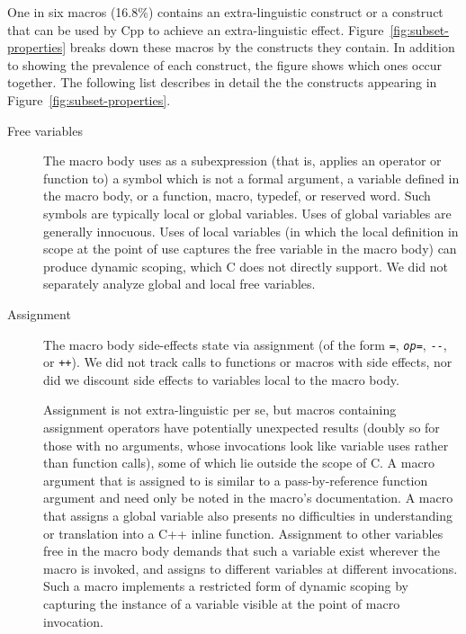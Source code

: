 \documentclass[10pt]{article}
\begin{document}
One in six macros (16.8\%) contains an extra-linguistic construct or a
construct that can be used by Cpp to achieve an extra-linguistic effect.
Figure~\ref{fig:subset-properties} breaks down these macros by the
constructs they contain.  In addition to showing the prevalence of each
construct, the figure shows which ones occur together.  The following list
describes in detail the the constructs appearing in
Figure~\ref{fig:subset-properties}.


\label{desc:properties}

\begin{description}
\item[Free variables]\label{page:freevar}
  The macro body uses as a subexpression (that is, applies an operator or
  function to) a symbol which is not a formal argument, a variable defined
  in the macro body, or a function, macro, typedef, or reserved word.  Such
  symbols are typically local or global variables.  Uses of global
  variables are generally innocuous.  Uses of local variables (in which the
  local definition in scope at the point of use captures the free variable
  in the macro body) can produce dynamic scoping, which C does
  not directly support.  We did not separately analyze global and local
  free variables.

\item[Assignment]
  The macro body side-effects state via assignment (of the form {\tt =},
  {\tt {\em op}=}, {\tt -{}-}, or {\tt ++}).  We did not track calls to
  functions or macros with side effects, nor did we discount side
  effects to variables local to the macro body.  
  
  Assignment is not extra-linguistic per se, but macros containing
  assignment operators have potentially unexpected results (doubly so for
  those with no arguments, whose invocations look like variable uses rather
  than
  function calls), some of which lie outside the scope of C\@.  A macro
  argument that is assigned to is similar to a pass-by-reference function
  argument and need only be noted in the macro's documentation.  A macro
  that assigns a global variable also presents no difficulties in
  understanding or translation into a C++ inline function.  Assignment to
  other variables free in the macro body demands that such a variable exist
  wherever the macro is invoked, and assigns to different variables at
  different invocations.  Such a macro implements a restricted form of
  dynamic scoping by capturing the instance of a variable visible at the
  point of macro invocation.


\end{description}
\end{document}
